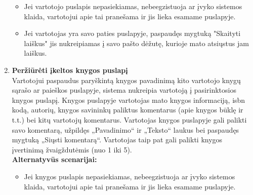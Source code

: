 \documentclass{VUMIFPSkursinis}
\begin{document}
\begin{enumerate}[label=\textbf{U\arabic*.}]
\begin{itemize}
					\item Jei vartotojo puslapis nepasiekiamas, nebeegzistuoja ar įvyko sistemos klaida, vartotojui apie tai pranešama ir jis lieka esamame puslapyje.
					\item Jei vartotojas yra savo paties puslapyje, paspaudęs mygtuką "Skaityti laiškus" jis nukreipiamas į savo pašto dėžutę, kurioje mato atsiųstus jam laiškus.
				\end{itemize}
			\item \textbf{Peržiūrėti įkeltos knygos puslapį}\\
				Vartotojui paspaudus paryškintą knygos pavadinimą kito vartotojo knygų sąrašo ar paieškos puslapyje, sistema nukreipia vartotoją į pasirinktosios knygos puslapį.
				Knygos puslapyje vartotojas mato knygos informaciją, isbn kodą, autorių, knygos savininkų paliktus komentarus (apie knygos būklę ir t.t.) bei kitų vartotojų komentarus.
				Vartotojas knygos puslapyje gali palikti savo komentarą, užpildęs „Pavadinimo“ ir „Teksto“ laukus bei paspaudęs mygtuką „Siųsti komentarą“. Vartotojas taip pat gali palikti knygos įvertinimą žvaigždutėmis (nuo 1 iki 5).\\
				\textbf{Alternatyvūs scenarijai:}
				\begin{itemize}
					\item Jei knygos puslapis nepasiekiamas, nebeegzistuoja ar įvyko sistemos klaida, vartotojui apie tai pranešama ir jis lieka esamame puslapyje.
				\end{itemize}


\end{enumerate}
\end{document}
